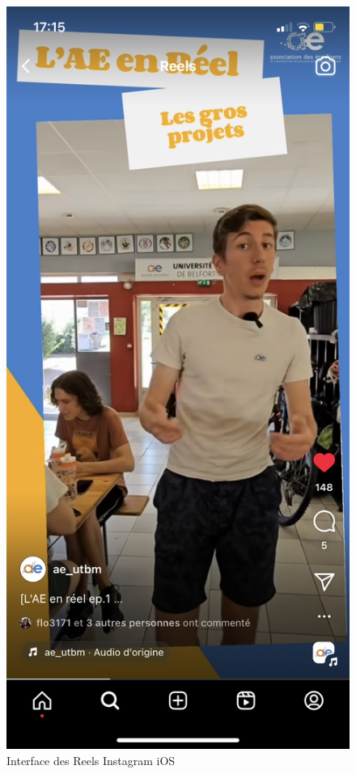 \begin{figure}[!h]
    \begin{center}
        \includegraphics[scale=0.2]{ressources/interfaceInsta}
        \caption{Interface des Reels Instagram iOS \label{fig:interfaceInsta}}
    \end{center}
\end{figure}
